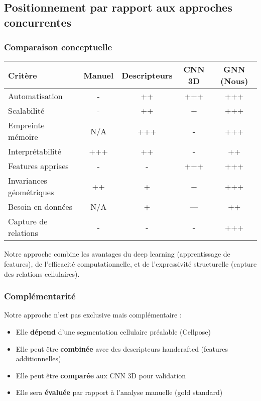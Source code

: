 \subsection{Positionnement par rapport aux approches concurrentes}

\subsubsection{Comparaison conceptuelle}

\begin{center}
\begin{tabular}{|l|c|c|c|c|}
\hline
\textbf{Critère} & \textbf{Manuel} & \textbf{Descripteurs} & \textbf{CNN 3D} & \textbf{GNN (Nous)} \\
\hline
Automatisation & - & ++ & +++ & +++ \\
Scalabilité & - & ++ & + & +++ \\
Empreinte mémoire & N/A & +++ & - & +++ \\
Interprétabilité & +++ & ++ & - & ++ \\
Features apprises & - & - & +++ & +++ \\
Invariances géométriques & ++ & + & + & +++ \\
Besoin en données & N/A & + & --- & ++ \\
Capture de relations & - & - & - & +++ \\
\hline
\end{tabular}
\end{center}

Notre approche combine les avantages du deep learning (apprentissage de features), de l'efficacité computationnelle, et de l'expressivité structurelle (capture des relations cellulaires).

\subsubsection{Complémentarité}

Notre approche n'est pas exclusive mais complémentaire :
\begin{itemize}
    \item Elle \textbf{dépend} d'une segmentation cellulaire préalable (Cellpose)
    \item Elle peut être \textbf{combinée} avec des descripteurs handcrafted (features additionnelles)
    \item Elle peut être \textbf{comparée} aux CNN 3D pour validation
    \item Elle sera \textbf{évaluée} par rapport à l'analyse manuelle (gold standard)
\end{itemize}

